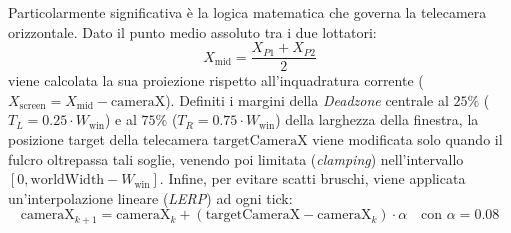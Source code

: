 \documentclass[11pt, a4paper]{article}
\begin{document}
Particolarmente significativa è la logica matematica che governa la telecamera orizzontale. Dato il punto medio assoluto tra i due lottatori:
\begin{equation}
    X_{\text{mid}} = \frac{X_{P1} + X_{P2}}{2}
\end{equation}
viene calcolata la sua proiezione rispetto all'inquadratura corrente ($X_{\text{screen}} = X_{\text{mid}} - \text{cameraX}$). Definiti i margini della \emph{Deadzone} centrale al $25\%$ ($T_L = 0.25 \cdot W_{\text{win}}$) e al $75\%$ ($T_R = 0.75 \cdot W_{\text{win}}$) della larghezza della finestra, la posizione target della telecamera $\text{targetCameraX}$ viene modificata solo quando il fulcro oltrepassa tali soglie, venendo poi limitata (\emph{clamping}) nell'intervallo $[0, \text{worldWidth} - W_{\text{win}}]$. Infine, per evitare scatti bruschi, viene applicata un'interpolazione lineare (\emph{LERP}) ad ogni tick:
\begin{equation}
    \text{cameraX}_{k+1} = \text{cameraX}_{k} + \left(\text{targetCameraX} - \text{cameraX}_{k}\right) \cdot \alpha \quad \text{con } \alpha = 0.08
\end{equation}
\end{document}
